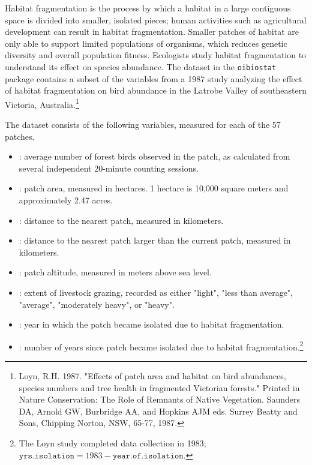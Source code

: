 Habitat fragmentation is the process by which a habitat in a large contiguous space is divided into smaller, isolated pieces; human activities such as agricultural development can result in habitat fragmentation. Smaller patches of habitat are only able to support limited populations of organisms, which reduces genetic diversity and overall population fitness. Ecologists study habitat fragmentation to understand its effect on species abundance. The  dataset in the \texttt{oibiostat} package contains a subset of the variables from a 1987 study analyzing the effect of habitat fragmentation on bird abundance in the Latrobe Valley of southeastern Victoria, Australia.\footnote{Loyn, R.H. 1987. "Effects of patch area and habitat on bird abundances, species numbers and tree health in fragmented Victorian forests." Printed in Nature Conservation: The Role of Remnants of Native Vegetation. Saunders DA, Arnold GW, Burbridge AA, and Hopkins AJM eds. Surrey Beatty and Sons, Chipping Norton, NSW, 65-77, 1987.}

The dataset consists of the following variables, measured for each of the 57 patches.
\begin{itemize}
  \item {}: average number of forest birds observed in the patch, as calculated from several independent 20-minute counting sessions. 

  \item {}: patch area, measured in hectares. 1 hectare is 10,000 square meters and approximately 2.47 acres.

  \item {}: distance to the nearest patch, measured in kilometers.

  \item {}: distance to the nearest patch larger than the current patch, measured in kilometers.

  \item {}: patch altitude, measured in meters above sea level.

  \item {}: extent of livestock grazing, recorded as either "light", "less than average", "average", "moderately heavy", or "heavy". 

  \item {}: year in which the patch became isolated due to habitat fragmentation.

  \item {}: number of years since patch became isolated due to habitat fragmentation.\footnote{The Loyn study completed data collection in 1983;  $\texttt{yrs.isolation} = 1983 - \texttt{year.of.isolation}$.}
\end{itemize}
 
